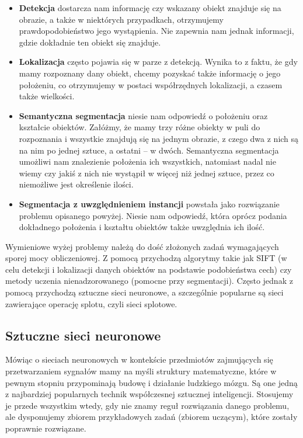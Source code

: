 \documentclass[12pt]{article}
\begin{document}
\begin{itemize}
\item \textbf{Detekcja} dostarcza nam informację czy wskazany obiekt znajduje się na obrazie,
a także w niektórych przypadkach, otrzymujemy prawdopodobieństwo jego wystąpienia. Nie zapewnia nam jednak informacji, gdzie dokładnie ten obiekt się znajduje.

\item \textbf{Lokalizacja} często pojawia się w parze z detekcją. Wynika to z faktu, że gdy mamy rozpoznany dany obiekt, chcemy pozyskać także informację o jego położeniu, co otrzymujemy w postaci współrzędnych lokalizacji, a czasem także wielkości.

\item \textbf{Semantyczna segmentacja} niesie nam odpowiedź o położeniu oraz kształcie obiektów. Załóżmy, że mamy trzy różne obiekty w puli do rozpoznania i wszystkie znajdują się na jednym obrazie, z czego dwa z nich są na nim po jednej sztuce, a ostatni – w dwóch. Semantyczna segmentacja umożliwi nam znalezienie położenia ich wszystkich, natomiast nadal nie wiemy czy jakiś z nich nie wystąpił w więcej niż jednej sztuce, przez co niemożliwe jest określenie ilości.

\item \textbf{Segmentacja z uwzględnieniem instancji} powstała jako rozwiązanie problemu opisanego powyżej. Niesie nam odpowiedź, która oprócz podania dokładnego położenia i kształtu obiektów także uwzględnia ich ilość.
\end{itemize} 

Wymieniowe wyżej problemy należą do dość złożonych zadań wymagających sporej mocy obliczeniowej. Z pomocą przychodzą algorytmy takie jak SIFT (w celu detekcji i lokalizacji danych obiektów na podstawie podobieństwa cech) czy metody uczenia nienadzorowanego (pomocne przy segmentacji). Często jednak z pomocą przychodzą sztuczne sieci neuronowe, a szczególnie popularne są sieci zawierające operację splotu, czyli sieci splotowe.

\subsection{Sztuczne sieci neuronowe}
Mówiąc o sieciach neuronowych w kontekście przedmiotów zajmujących się przetwarzaniem sygnałów mamy na myśli struktury matematyczne, które w pewnym stopniu przypominają budowę i działanie ludzkiego mózgu. Są one jedną z najbardziej popularnych technik współczesnej sztucznej inteligencji. Stosujemy je przede wszystkim wtedy, gdy nie znamy reguł rozwiązania danego problemu, ale dysponujemy zbiorem przykładowych zadań (zbiorem uczącym), które zostały poprawnie rozwiązane. 
\end{document}
